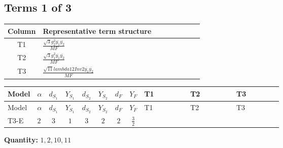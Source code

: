 \documentclass[8pt]{article}
\begin{document}
\begin{landscape}
\subsection*{Terms 1 of 3}
\begin{center}
\begin{tabular}{@{}c >{\raggedright\arraybackslash}p{0.82\linewidth}@{}}
\toprule
Column & Representative term structure \\
\midrule
T1 & \(\displaystyle \frac{\sqrt{3} g_{2}^{2} \overline{y_{1}} \overline{y_{2}}}{MF}\) \\
\midrule
T2 & \(\displaystyle \frac{\sqrt{3} g_{1}^{2} \overline{y_{1}} \overline{y_{2}}}{MF}\) \\
\midrule
T3 & \(\displaystyle \frac{\sqrt{11} lambda12Inv2 \overline{y_{1}} \overline{y_{2}}}{MF}\) \\
\midrule
\bottomrule
\end{tabular}
\end{center}
\smallskip
\tiny
\begin{longtable}{@{}llcccccc >{\raggedright\arraybackslash}p{0.21\linewidth} >{\raggedright\arraybackslash}p{0.21\linewidth} >{\raggedright\arraybackslash}p{0.21\linewidth}@{}}
\toprule
Model & $\alpha$ & $d_{S_1}$ & $Y_{S_1}$ & $d_{S_2}$ & $Y_{S_2}$ & $d_F$ & $Y_F$ & T1 & T2 & T3 \\
\midrule
\endfirsthead
\toprule
Model & $\alpha$ & $d_{S_1}$ & $Y_{S_1}$ & $d_{S_2}$ & $Y_{S_2}$ & $d_F$ & $Y_F$ & T1 & T2 & T3 \\
\midrule
\endhead
T3-E & $2$ & $3$ & $1$ & $3$ & $2$ & $2$ & $\frac{3}{2}$ & \scriptsize\adjustbox{max width=\linewidth}{$\begin{gathered} - \frac{15 \sqrt{3} g_{2}^{2} \overline{y_{1}} \overline{y_{2}}}{8 MF}\end{gathered}$} & \scriptsize\adjustbox{max width=\linewidth}{$\begin{gathered} - \frac{9 \sqrt{3} g_{1}^{2} \overline{y_{1}} \overline{y_{2}}}{8 MF}\end{gathered}$} & \scriptsize\adjustbox{max width=\linewidth}{$\begin{gathered} - \frac{3 \sqrt{11} lambda12Inv2 \overline{y_{1}} \overline{y_{2}}}{22 MF}\end{gathered}$} \\
\midrule
\bottomrule
\end{longtable}
\clearpage
\noindent\textbf{Quantity: }$\mathrm{1,2,10,11}$\par\smallskip

\end{landscape}
\end{document}
